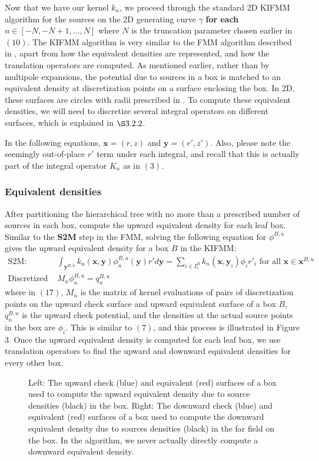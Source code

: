 \documentclass[11pt, oneside]{article}   	%
\begin{document}
Now that we have our kernel $k_n$, we proceed through the standard 2D KIFMM algorithm for the sources on the 2D generating curve $\gamma$ \textbf{for each} $n\in[-N,-N+1,\dots,N]$ where $N$ is the truncation parameter chosen earlier in $(10)$. The KIFMM algorithm is very similar to the FMM algorithm described in \cite{CGR}, apart from how the equivalent densities are represented, and how the translation operators are computed. As mentioned earlier, rather than by multipole expansions, the potential due to sources in a box is matched to an equivalent density at discretization points on a surface enclosing the box. In 2D, these surfaces are circles with radii prescribed in \cite{YBZ}. To compute these equivalent densities, we will need to discretize several integral operators on different surfaces, which is explained in $\S3.2.2$.

In the following equations, $\mathbf{x}=(r,z)$ and $\mathbf{y}=(r',z')$. Also, please note the seemingly out-of-place $r'$ term under each integral, and recall that this is actually part of the integral operator $K_n$ as in $(3)$.
\subsubsection{Equivalent densities}
After partitioning the hierarchical tree with no more than a prescribed number of sources in each box, compute the upward equivalent density for each leaf box. Similar to the \textbf{S2M} step in the FMM, solving the following equation for $\phi^{B,u}$ gives the upward equivalent density for a box $B$ in the KIFMM:
\begin{align}
\mbox{S2M: }&\int_{\mathbf{y}^{B,u}}{k_n(\mathbf{x},\mathbf{y})}\phi^{B,u}_n{(\mathbf{y})}r'd\mathbf{y}=\sum\limits_{i\in I_s^B} k_n(\mathbf{x},\mathbf{y}_i)\phi_ir'_i\mbox{ for all }\mathbf{x}\in\mathbf{x}^{B,u}\\
\mbox{Discretized S2M: }&M_n\phi^{B,u}_n=q_n^{B,u}
\end{align}
where in $(17)$, $M_n$ is the matrix of kernel evaluations of pairs of discretization points on the upward check surface and upward equivalent surface of a box $B$, $q_n^{B,u}$ is the upward check potential, and the densities at the actual source points in the box are $\phi_i$. This is similar to $(7)$, and this process is illustrated in Figure 3. Once the upward equivalent density is computed for each leaf box, we use translation operators to find the upward and downward equivalent densities for every other box.

\begin{figure}[!ht]
\begin{center}
\end{center}
\caption{Left: The upward check (blue) and equivalent (red) surfaces of a box used to compute the upward equivalent density due to source densities (black) in the box. Right: The downward check (blue) and equivalent (red) surfaces of a box used to compute the downward equivalent density due to sources densities (black) in the far field on the box. In the algorithm, we never actually directly compute a downward equivalent density.}
\end{figure}
\end{document}
